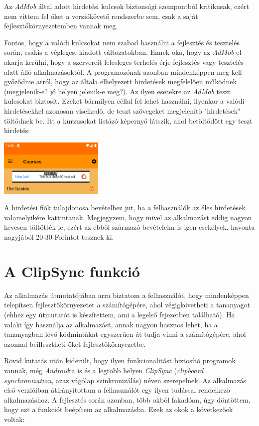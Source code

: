 \documentclass[12pt,a4paper]{article}
\begin{document}
	Az \textit{AdMob} által adott hirdetési kulcsok biztonsági szempontból kritikusak, ezért nem vittem fel őket a verziókövető rendszerbe sem, csak a saját fejlesztőkörnyezetemben vannak meg. 
	
	Fontos, hogy a valódi kulcsokat nem szabad használni a fejlesztés és tesztelés során, csakis a végleges, kiadott változatokban. Ennek oka, hogy az \textit{AdMob} el akarja kerülni, hogy a szervereit felesleges terhelés érje fejlesztés vagy tesztelés alatt álló alkalmazásoktól. A programozónak azonban mindenképpen meg kell győződnie arról, hogy az általa elhelyezett hirdetések megfelelően működnek (megjelenik-e? jó helyen jelenik-e meg?). Az ilyen esetekre az \textit{AdMob} teszt kulcsokat biztosít. Ezeket bármilyen céllal fel lehet használni, ilyenkor a valódi hirdetésekkel azonosan viselkedő, de teszt szövegeket megjelenítő "hirdetések" töltődnek be. Itt a kurzusokat listázó képernyő látszik, ahol betöltődött egy teszt hirdetés:  
	
	\begin{center}
		\includegraphics[width=5cm]{test_ad}
	\end{center}

	A hirdetési fiók tulajdonosa bevételhez jut, ha a felhasználók az éles hirdetések valamelyikére kattintanak. Megjegyzem, hogy mivel az alkalmazást eddig nagyon kevesen töltötték le, ezért az ebből származó bevételeim is igen csekélyek, havonta nagyjából 20-30 Forintot tesznek ki.

	\section{A ClipSync funkció}\label{clipsync}
	
	Az alkalmazás útmutatójában arra biztatom a felhasználót, hogy mindenképpen telepítsen fejlesztőkörnyezetet a számítógépére, ahol végigkövetheti a tananyagot (ehhez egy útmutatót is készítettem, ami a legelső fejezetben található). Ha valaki így használja az alkalmazást, annak nagyon hasznos lehet, ha a tananyagban lévő kódmintákat egyszerűen át tudja vinni a számítógépére, ahol azonnal beillesztheti őket fejlesztőkörnyezetbe.
	
	Rövid kutatás után kiderült, hogy ilyen funkcionalitást biztosító programok vannak, még \textit{Android}ra is és a legtöbb helyen \textit{ClipSync} (\textit{clipboard synchronization}, azaz vágólap szinkronizálás) néven szerepelnek. Az alkalmazás első verzióiban átirányítottam a 
	felhasználót egy ilyen tudással rendelkező alkalmazáshoz. A fejlesztés során azonban, több okból fakadóan, úgy döntöttem, hogy ezt a funkciót beépítem az alkalmazásba. Ezek az okok a következőek voltak:
	
\end{document}

